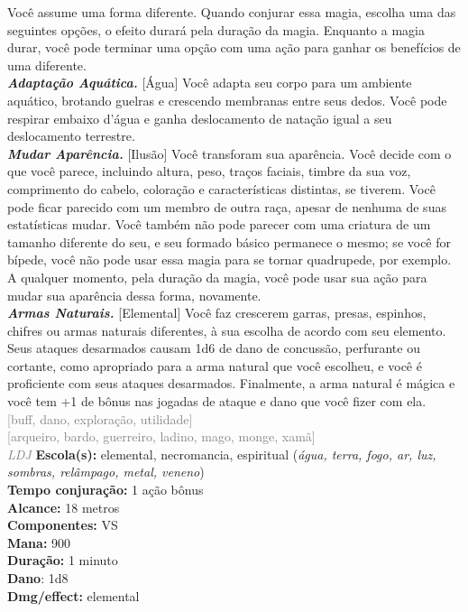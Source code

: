 \documentclass{RPG_Adventure}[2021/10/20]
\begin{document}
{\normalsize Você assume uma forma diferente. Quando conjurar essa magia, escolha uma das seguintes opções, o efeito durará pela duração da magia. Enquanto a magia durar, você pode terminar uma opção com uma ação para ganhar os benefícios de uma diferente.\\\t \textbf{\textit{Adaptação Aquática.}} [Água] Você adapta seu corpo para um ambiente aquático, brotando guelras e crescendo membranas entre seus dedos. Você pode respirar embaixo d’água e ganha deslocamento de natação igual a seu deslocamento terrestre.\\\t \textbf{\textit{Mudar Aparência.}} [Ilusão] Você transforam sua aparência. Você decide com o que você parece, incluindo altura, peso, traços faciais, timbre da sua voz, comprimento do cabelo, coloração e características distintas, se tiverem. Você pode ficar parecido com um membro de outra raça, apesar de nenhuma de suas estatísticas mudar. Você também não pode parecer com uma criatura de um tamanho diferente do seu, e seu formado básico permanece o mesmo; se você for bípede, você não pode usar essa magia para se tornar quadrupede, por exemplo. A qualquer momento, pela duração da magia, você pode usar sua ação para mudar sua aparência dessa forma, novamente.\\\t \textbf{\textit{Armas Naturais.}} [Elemental] Você faz crescerem garras, presas, espinhos, chifres ou armas naturais diferentes, à sua escolha de acordo com seu elemento. Seus ataques desarmados causam 1d6 de dano de concussão, perfurante ou cortante, como apropriado para a arma natural que você escolheu, e você é proficiente com seus ataques desarmados. Finalmente, a arma natural é mágica e você tem +1 de bônus nas jogadas de ataque e dano que você fizer com ela.\\}
{\scriptsize \textcolor{gray}{[buff, dano, exploração, utilidade]\\}}
{\scriptsize \textcolor{gray}{[arqueiro, bardo, guerreiro, ladino, mago, monge, xamã]\\}}
{\tiny \textcolor{gray}{\textit{LDJ}}}\jump{}
{\small \t \textbf{Escola(s):} elemental, necromancia, espiritual (\textit{água, terra, fogo, ar, luz, sombras, relâmpago, metal, veneno})\\\t \textbf{Tempo conjuração:} 1 ação bônus\\\t \textbf{Alcance:} 18 metros\\\t \textbf{Componentes:} VS\\\t \textbf{Mana:} 900\\\t \textbf{Duração:} 1 minuto\\\t \textbf{Dano}: 1d8\\\t \textbf{Dmg/effect:} elemental\\}
\end{document}
